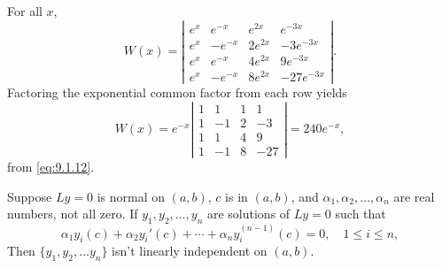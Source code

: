 \begin{examplesolution}
\solution For all $x$,
\[
  W(x)=\left|
  \begin{array}{rrrr}
    e^{x} & e^{-x}  & e^{2x}  & e^{-3x}    \\
    e^{x} & -e^{-x} & 2e^{2x} & -3e^{-3x}  \\
    e^{x} & e^{-x}  & 4e^{2x} & 9e^{-3x}   \\
    e^{x} & -e^{-x} & 8e^{2x} & -27e^{-3x}
  \end{array}\right|.
\]
Factoring the exponential common factor from each row yields
\[
  W(x)=e^{-x}\left|
  \begin{array}{rrrr}
    1 & 1  & 1 & 1   \\
    1 & -1 & 2 & -3  \\
    1 & 1  & 4 & 9   \\
    1 & -1 & 8 & -27
  \end{array}\right|=240e^{-x},
\]
from \eqref{eq:9.1.12}.
\end{examplesolution}

\color{blue}
\color{black}

\begin{theorem}
  \color{blue}
  \label{thmtype:9.1.5} Suppose $Ly=0$ is normal on $(a,b)$, $c$ is in $(a,b)$, and $\alpha_{1},\alpha_{2},\dots,\alpha_{n}$ are real
  numbers, not all zero. If $y_{1},y_{2},\dots,y_{n}$ are solutions of $Ly=0$ such that
  \begin{equation}
    \label{eq:9.1.16}\alpha_{1}y_{i}(c)+\alpha_{2}y_{i}'(c)+\cdots+\alpha_{n}y_{i}^{(n-1)}(c)=0,\quad1\le i\le n,
  \end{equation}
  Then $\{y_{1},y_{2},\dots y_{n}\}$ isn't linearly independent on $(a,b)$.
\end{theorem}

